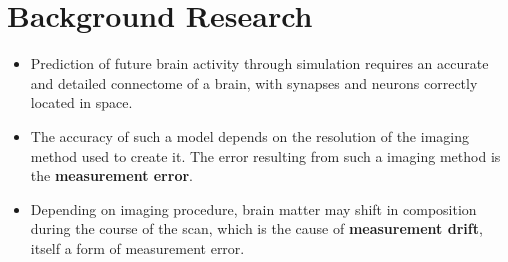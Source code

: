 \chapter{Background Research}

\begin{itemize}
    \item Prediction of future brain activity through simulation requires an accurate and detailed connectome of a brain, with synapses and neurons correctly located in space.\autocite{bostrom_whole_2008}
    \item The accuracy of such a model depends on the resolution of the imaging method used to create it. The error resulting from such a imaging method is the \textbf{measurement error}. 
    \item Depending on imaging procedure, brain matter may shift in composition during the course of the scan, which is the cause of \textbf{measurement drift}, itself a form of measurement error.
\end{itemize}




